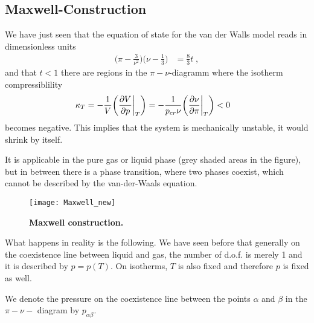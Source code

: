 \subsection{Maxwell-Construction}

We have just seen that the equation of state for the van der Walls model reads in dimensionless units
%
\begin{align*}
\bigg( \pi - \frac{3}{\nu^{2}} \bigg)\bigg(\nu  -\frac{1}{3}\bigg) &=\frac{8}{3} t\;,
\end{align*}
%
and that  $t<1$ there   are regions in the $\pi-\nu$-diagramm where the isotherm compressiblility
%
\begin{align}\label{eq:}
\kappa_{T}&= - \frac{1}{V} \bigg(  \frac{\partial V}{\partial p}\bigg|_{T}\bigg)
= - \frac{1}{p_{cr} \nu} \bigg(  \frac{\partial \nu}{\partial \pi}\bigg|_{T}\bigg) <0
\end{align}
%
becomes negative. This implies that the system is mechanically unstable, it would shrink by itself.

\newpage 

It is applicable  in the pure gas or  liquid phase (grey shaded areas in the figure),
but in between there is a phase transition, where two phases coexist, which cannot be described by the van-der-Waals equation.
%
\begin{figure}[htbp]
\begin{center}
\texttt{[image: Maxwell\_new]}
\caption{\bf Maxwell construction.}
\label{fig:Maxwell}
\end{center}
\end{figure}
%


What happens in reality is the following. We have seen before that generally on the coexistence 
line between liquid and gas, the number of d.o.f. is merely 1 and it is described by $p=p(T)$.
On isotherms, $T$ is also fixed and therefore $p$ is fixed as well.

%

We denote the pressure on the coexistence line between the points $\alpha$ and $\beta$ in the 
$\pi-\nu-$ diagram by $p_{\alpha\beta}$.

